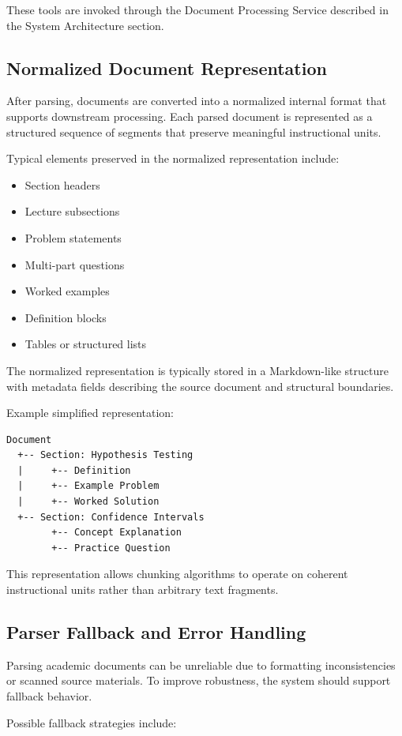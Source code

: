 \documentclass[11pt]{article}
\begin{document}
These tools are invoked through the Document Processing Service described in the System Architecture section.

\subsection{Normalized Document Representation}
After parsing, documents are converted into a normalized internal format that supports downstream processing. Each parsed document is represented as a structured sequence of segments that preserve meaningful instructional units.

Typical elements preserved in the normalized representation include:

\begin{itemize}
\item Section headers
\item Lecture subsections
\item Problem statements
\item Multi-part questions
\item Worked examples
\item Definition blocks
\item Tables or structured lists
\end{itemize}

The normalized representation is typically stored in a Markdown-like structure with metadata fields describing the source document and structural boundaries.

Example simplified representation:

\begin{verbatim}
Document
  +-- Section: Hypothesis Testing
  |     +-- Definition
  |     +-- Example Problem
  |     +-- Worked Solution
  +-- Section: Confidence Intervals
        +-- Concept Explanation
        +-- Practice Question
\end{verbatim}

This representation allows chunking algorithms to operate on coherent instructional units rather than arbitrary text fragments.

\subsection{Parser Fallback and Error Handling}
Parsing academic documents can be unreliable due to formatting inconsistencies or scanned source materials. To improve robustness, the system should support fallback behavior.

Possible fallback strategies include:
\end{document}
